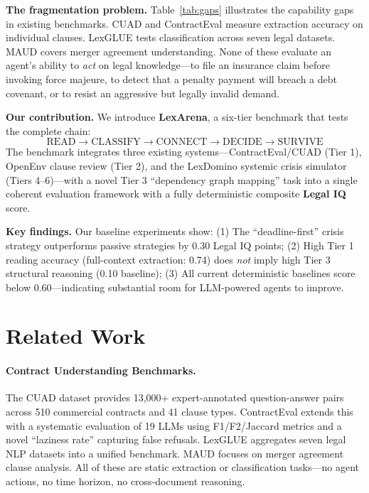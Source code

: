 \documentclass[11pt]{article}
\begin{document}
\textbf{The fragmentation problem.} Table~\ref{tab:gaps} illustrates the capability gaps in existing benchmarks. CUAD \citep{hendrycks2021cuad} and ContractEval \citep{contracteval2024} measure extraction accuracy on individual clauses. LexGLUE \citep{chalkidis2022lexglue} tests classification across seven legal datasets. MAUD \citep{wang2023maud} covers merger agreement understanding. None of these evaluate an agent's ability to \emph{act} on legal knowledge---to file an insurance claim before invoking force majeure, to detect that a penalty payment will breach a debt covenant, or to resist an aggressive but legally invalid demand.

\textbf{Our contribution.} We introduce \textbf{LexArena}, a six-tier benchmark that tests the complete chain:
\[
\text{READ} \rightarrow \text{CLASSIFY} \rightarrow \text{CONNECT} \rightarrow \text{DECIDE} \rightarrow \text{SURVIVE}
\]
The benchmark integrates three existing systems---ContractEval/CUAD (Tier 1), OpenEnv clause review (Tier 2), and the LexDomino systemic crisis simulator (Tiers 4--6)---with a novel Tier 3 ``dependency graph mapping'' task into a single coherent evaluation framework with a fully deterministic composite \textbf{Legal IQ} score.

\textbf{Key findings.} Our baseline experiments show:
(1) The ``deadline-first'' crisis strategy outperforms passive strategies by 0.30 Legal IQ points;
(2) High Tier 1 reading accuracy (full-context extraction: 0.74) does \emph{not} imply high Tier 3 structural reasoning (0.10 baseline);
(3) All current deterministic baselines score below 0.60---indicating substantial room for LLM-powered agents to improve.

\section{Related Work}

\paragraph{Contract Understanding Benchmarks.}
The CUAD dataset \citep{hendrycks2021cuad} provides 13,000+ expert-annotated question-answer pairs across 510 commercial contracts and 41 clause types. ContractEval \citep{contracteval2024} extends this with a systematic evaluation of 19 LLMs using F1/F2/Jaccard metrics and a novel ``laziness rate'' capturing false refusals. LexGLUE \citep{chalkidis2022lexglue} aggregates seven legal NLP datasets into a unified benchmark. MAUD \citep{wang2023maud} focuses on merger agreement clause analysis. All of these are static extraction or classification tasks---no agent actions, no time horizon, no cross-document reasoning.
\end{document}
